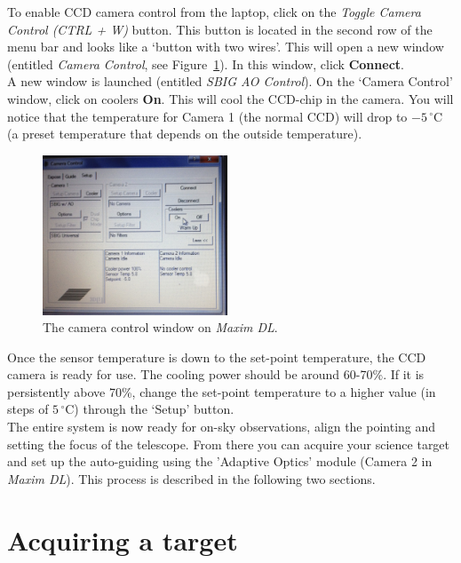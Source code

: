 \documentclass[12pt,twoside,a4paper]{report}
\begin{document}
To enable CCD camera control from the laptop, click on the \textit{Toggle Camera Control (CTRL + W)} button.
This button is located in the second row of the menu bar and looks like a `button with two wires'. 
This will open a new window (entitled \emph{Camera Control}, see Figure~\ref{fig:coolers}).  
In this window, click \textbf{Connect}.\\

A new window is launched (entitled \emph{SBIG AO Control}). On the `Camera Control' window, click on
coolers \textbf{On}. This will cool the CCD-chip in the camera. You will notice that the temperature for 
Camera 1 (the normal CCD) will drop to $-5 \,^{\circ}\mathrm{C}$ (a preset temperature that depends on the outside 
temperature).\\

\begin{figure}[ht]
 \centering
    \includegraphics[width=0.49\textwidth]{documentation_images/maximdl_cooler}
    \caption{\label{fig:coolers}The camera control window on \emph{Maxim DL}.}
\end{figure}

Once the sensor temperature is down to the set-point temperature, the CCD camera is ready for use. 
The cooling power should be around 60-70\%. If it is persistently above 70\%, change the set-point 
temperature to a higher value (in steps of $5 \,^{\circ}\mathrm{C}$) through the `Setup' button.\\

The entire system is now ready for on-sky observations, align the pointing and setting the focus of the telescope. From there you can acquire your science target and set up the auto-guiding using the 'Adaptive Optics' module (Camera 2 in \emph{Maxim DL}). This process is described in the following two sections.

\section{Acquiring a target}
\label{acquire}
\end{document}
